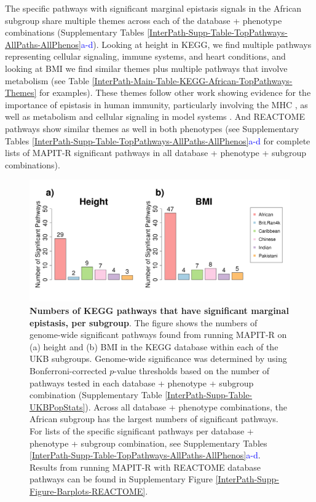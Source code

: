 \documentclass[12pt,a4paper]{article}
\begin{document}
The specific pathways with significant marginal epistasis signals in the African subgroup share multiple themes across each of the database + phenotype combinations (Supplementary Tables \ref{InterPath-Supp-Table-TopPathways-AllPaths-AllPhenos}\textcolor{blue}{a-d}). Looking at height in KEGG, we find multiple pathways representing cellular signaling, immune systems, and heart conditions, and looking at BMI we find similar themes plus multiple pathways that involve metabolism (see Table \ref{InterPath-Main-Table-KEGG-African-TopPathways-Themes} for examples). These themes follow other work showing evidence for the importance of epistasis in human immunity, particularly involving the MHC \citep{Martin2002,Williams2005,Wan2010,Rose2012,Lareau2016,Opi2018,Zhang2019}, as well as metabolism and cellular signaling in model systems \citep{Segre2005,Snitkin2011,Podgornaia2015,Sorrells2015,Tyler2017,Nghe2018,Jiao2019}. And REACTOME pathways show similar themes as well in both phenotypes (see Supplementary Tables \ref{InterPath-Supp-Table-TopPathways-AllPaths-AllPhenos}\textcolor{blue}{a-d} for complete lists of MAPIT-R significant pathways in all database + phenotype + subgroup combinations).  


\begin{figure}[htb]
\centering
\hspace*{-.9cm}
\includegraphics[scale=.45]{Images/Main/InterPath_Main_Figure_Barplots_KEGG_vs4.png}
\caption[TBD]{\textbf{Numbers of KEGG pathways that have significant marginal epistasis, per subgroup}. The figure shows the numbers of genome-wide significant pathways found from running MAPIT-R on (a) height and (b) BMI in the KEGG database within each of the UKB subgroups.  Genome-wide significance was determined by using Bonferroni-corrected $p$-value thresholds based on the number of pathways tested in each database + phenotype + subgroup combination (Supplementary Table \ref{InterPath-Supp-Table-UKBPopStats}). Across all database + phenotype combinations, the African subgroup has the largest numbers of significant pathways. For lists of the specific significant pathways per database + phenotype + subgroup combination, see Supplementary Tables \ref{InterPath-Supp-Table-TopPathways-AllPaths-AllPhenos}\textcolor{blue}{a-d}. Results from running MAPIT-R with REACTOME database pathways can be found in Supplementary Figure \ref{InterPath-Supp-Figure-Barplots-REACTOME}.}
\label{InterPath-Main-Figure-Barplots-KEGG}
\end{figure}
\end{document}
